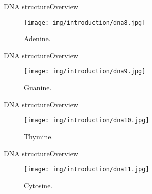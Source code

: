 \documentclass[10pt]{beamer}
\newcommand{\1}{
	\setbeamertemplate{background}{
		\texttt{[image: img/1]}
		\tikz[overlay] \fill[fill opacity=0.75,fill=white] (0,0) rectangle (-\paperwidth,\paperheight);
	}
}
\begin{document}
\begin{frame}{DNA structure}{Overview}
	\begin{figure}[]
		\centering
		\texttt{[image: img/introduction/dna8.jpg]}
		\label{img:mot2}
		\caption{Adenine.}
	\end{figure}
\end{frame}

\begin{frame}{DNA structure}{Overview}
	\begin{figure}[]
		\centering
		\texttt{[image: img/introduction/dna9.jpg]}
		\label{img:mot2}
		\caption{Guanine.}
	\end{figure}
\end{frame}

\begin{frame}{DNA structure}{Overview}
	\begin{figure}[]
		\centering
		\texttt{[image: img/introduction/dna10.jpg]}
		\label{img:mot2}
		\caption{Thymine.}
	\end{figure}
\end{frame}

\begin{frame}{DNA structure}{Overview}
	\begin{figure}[]
		\centering
		\texttt{[image: img/introduction/dna11.jpg]}
		\label{img:mot2}
		\caption{Cytosine.}
	\end{figure}
\end{frame}
\end{document}
